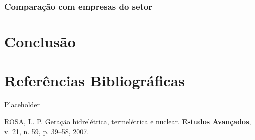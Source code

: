 \documentclass[grad,numbers]{coppe}
\newenvironment{cslreferences}%
  {}%
  {\par}
\begin{document}
  \hypertarget{comparauxe7uxe3o-com-empresas-do-setor}{%
  \subsection{Comparação com empresas do setor}\label{comparauxe7uxe3o-com-empresas-do-setor}}

  \hypertarget{conclusuxe3o}{%
  \chapter{Conclusão}\label{conclusuxe3o}}

  \hypertarget{referuxeancias-bibliogruxe1ficas}{%
  \chapter*{Referências Bibliográficas}\label{referuxeancias-bibliogruxe1ficas}}

  Placeholder

  \hypertarget{refs}{}
  \begin{cslreferences}
  \leavevmode\hypertarget{ref-rosa2007}{}%
  ROSA, L. P. Geração hidrelétrica, termelétrica e nuclear. \textbf{Estudos Avançados}, v. 21, n. 59, p. 39--58, 2007.
  \end{cslreferences}
  \backmatter
  
  

\end{document}
